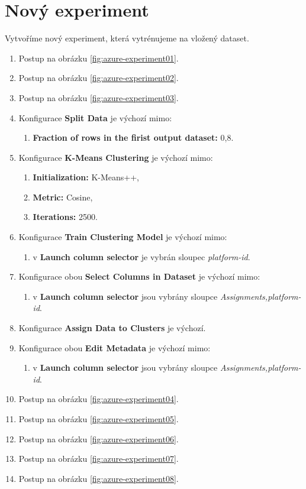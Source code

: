 \documentclass[thesis=M,czech]{FITthesis}[2012/10/20]
\begin{document}
	\section{Nový experiment}
		Vytvoříme nový experiment, která vytrénujeme na vložený dataset.
		
		\begin{enumerate}
			\item Postup na obrázku \ref{fig:azure-experiment01}.
			\item Postup na obrázku \ref{fig:azure-experiment02}.
			\item Postup na obrázku \ref{fig:azure-experiment03}.
			\item Konfigurace \textbf{Split Data} je výchozí mimo: 
				\begin{enumerate}
					\item \textbf{Fraction of rows in the firist output dataset:} 0,8.
				\end{enumerate}
			\item Konfigurace \textbf{K-Means Clustering} je výchozí mimo:
				\begin{enumerate}
					\item \textbf{Initialization:} K-Means++,
					\item \textbf{Metric:} Cosine,
					\item \textbf{Iterations:} 2500.
				\end{enumerate} 
			\item Konfigurace \textbf{Train Clustering Model} je výchozí mimo: 
				\begin{enumerate}
					\item v \textbf{Launch column selector} je vybrán sloupec \textit{platform-id}.
				\end{enumerate}
			\item Konfigurace obou \textbf{Select Columns in Dataset} je výchozí mimo: 
				\begin{enumerate}
					\item v \textbf{Launch column selector} jsou vybrány sloupce \textit{Assignments,platform-id}.
				\end{enumerate}
			\item Konfigurace \textbf{Assign Data to Clusters} je výchozí.
			\item Konfigurace obou \textbf{Edit Metadata} je výchozí mimo: 
				\begin{enumerate}
					\item v \textbf{Launch column selector} jsou vybrány sloupce \textit{Assignments,platform-id}.
				\end{enumerate}
			\item Postup na obrázku \ref{fig:azure-experiment04}.
			\item Postup na obrázku \ref{fig:azure-experiment05}.
			\item Postup na obrázku \ref{fig:azure-experiment06}.
			\item Postup na obrázku \ref{fig:azure-experiment07}.
			\item Postup na obrázku \ref{fig:azure-experiment08}.
		\end{enumerate}
		
\end{document}
